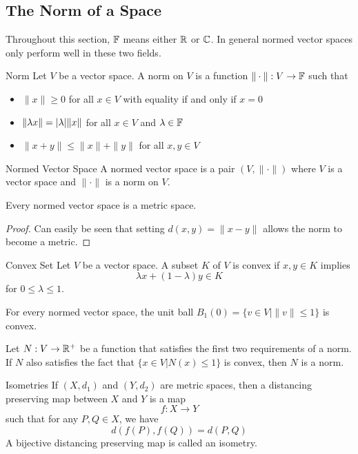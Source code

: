 \documentclass[a4paper]{article}
\begin{document}
\subsection{The Norm of a Space}
Throughout this section, $\mathbb{F}$ means either $\mathbb{R}$ or $\mathbb{C}$. In general normed vector spaces only perform well in these two fields. 
\begin{defn}{Norm}{} Let $V$ be a vector space. A norm on $V$ is a function $\|\cdot\|:V\to\mathbb{F}$ such that
\begin{itemize}
\item $\|x\|\geq 0$ for all $x\in V$ with equality if and only if $x=0$
\item $\|\lambda x\|=\abs{\lambda}\|x\|$ for all $x\in V$ and $\lambda\in\mathbb{F}$
\item $\|x+y\|\leq\|x\|+\|y\|$ for all $x,y\in V$
\end{itemize}
\end{defn}

\begin{defn}{Normed Vector Space}{} A normed vector space is a pair $(V,\|\cdot\|)$ where $V$ is a vector space and $\|\cdot\|$ is a norm on $V$. 
\end{defn}

\begin{prp}{}{} Every normed vector space is a metric space. \tcbline
\begin{proof} Can easily be seen that setting $d(x,y)=\|x-y\|$ allows the norm to become a metric. 
\end{proof}
\end{prp}

\begin{defn}{Convex Set}{} Let $V$ be a vector space. A subset $K$ of $V$ is convex if $x,y\in K$ implies $$\lambda x+(1-\lambda)y\in K$$ for $0\leq\lambda\leq 1$. 
\end{defn}

\begin{lmm}{}{} For every normed vector space, the unit ball $B_1(0)=\{v\in V|\|v\|\leq 1\}$ is convex. 
\end{lmm}

\begin{prp}{}{} Let $N:V\to\mathbb{R}^+$ be a function that satisfies the first two requirements of a norm. If $N$ also satisfies the fact that $\{x\in V|N(x)\leq 1\}$ is convex, then $N$ is a norm. 
\end{prp}

\begin{defn}{Isometries}{} If $(X,d_1)$ and $(Y,d_2)$ are metric spaces, then a distancing preserving map between $X$ and $Y$ is a map $$f:X\to Y$$ such that for any $P,Q\in X$, we have $$d(f(P),f(Q))=d(P,Q)$$ A bijective distancing preserving map is called an isometry. 
\end{defn}
\end{document}
